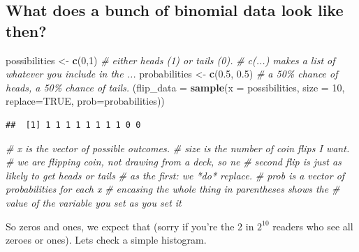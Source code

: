 \documentclass[
]{book}
\newenvironment{Shaded}{\begin{snugshade}}{\end{snugshade}}
\newcommand{\CommentTok}[1]{\textcolor[rgb]{0.56,0.35,0.01}{\textit{#1}}}
\newcommand{\DataTypeTok}[1]{\textcolor[rgb]{0.13,0.29,0.53}{#1}}
\newcommand{\DecValTok}[1]{\textcolor[rgb]{0.00,0.00,0.81}{#1}}
\newcommand{\FloatTok}[1]{\textcolor[rgb]{0.00,0.00,0.81}{#1}}
\newcommand{\KeywordTok}[1]{\textcolor[rgb]{0.13,0.29,0.53}{\textbf{#1}}}
\newcommand{\NormalTok}[1]{#1}
\newcommand{\OtherTok}[1]{\textcolor[rgb]{0.56,0.35,0.01}{#1}}
\newcommand{\StringTok}[1]{\textcolor[rgb]{0.31,0.60,0.02}{#1}}
\begin{document}
\hypertarget{what-does-a-bunch-of-binomial-data-look-like-then}{%
\subsection{What does a bunch of binomial data look like then?}\label{what-does-a-bunch-of-binomial-data-look-like-then}}

\begin{Shaded}
\begin{Highlighting}[]
\NormalTok{possibilities \textless{}{-}}\StringTok{ }\KeywordTok{c}\NormalTok{(}\DecValTok{0}\NormalTok{,}\DecValTok{1}\NormalTok{) }\CommentTok{\# either heads (1) or tails (0).}
                        \CommentTok{\# c(...) makes a list of whatever you include in the ...}
\NormalTok{probabilities \textless{}{-}}\StringTok{ }\KeywordTok{c}\NormalTok{(}\FloatTok{0.5}\NormalTok{, }\FloatTok{0.5}\NormalTok{)}
                        \CommentTok{\# a 50\% chance of heads, a 50\% chance of tails.}
\NormalTok{(}\DataTypeTok{flip\_data =} \KeywordTok{sample}\NormalTok{(}\DataTypeTok{x =}\NormalTok{ possibilities, }\DataTypeTok{size =} \DecValTok{10}\NormalTok{, }\DataTypeTok{replace=}\OtherTok{TRUE}\NormalTok{, }\DataTypeTok{prob=}\NormalTok{probabilities))}
\end{Highlighting}
\end{Shaded}

\begin{verbatim}
##  [1] 1 1 1 1 1 1 1 1 0 0
\end{verbatim}

\begin{Shaded}
\begin{Highlighting}[]
                        \CommentTok{\# x is the vector of possible outcomes.}
                        \CommentTok{\# size is the number of coin flips I want.}
                        \CommentTok{\# we are flipping coin, not drawing from a deck, so ne}
                        \CommentTok{\#   second flip is just as likely to get heads or tails}
                        \CommentTok{\#   as the first: we *do* replace.}
                        \CommentTok{\# prob is a vector of probabilities for each x}
                        \CommentTok{\# encasing the whole thing in parentheses shows the}
                        \CommentTok{\#   value of the variable you set as you set it}
\end{Highlighting}
\end{Shaded}

So zeros and ones, we expect that (sorry if you're the 2 in \(2^{10}\) readers who see all zeroes or ones). Lets check a simple histogram.
\end{document}
